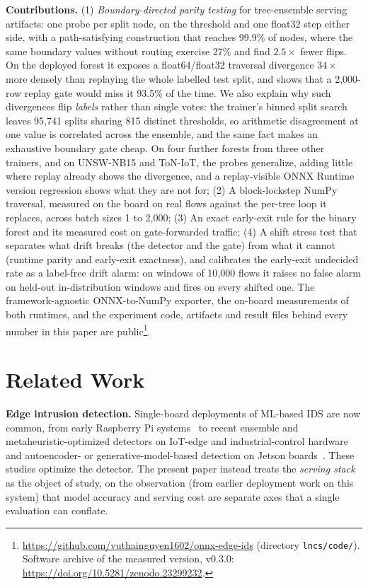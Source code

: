 \documentclass[runningheads]{llncs}
\begin{document}
\textbf{Contributions.}
(1) \emph{Boundary-directed parity testing} for tree-ensemble serving artifacts: one probe per split node, on the threshold and one float32 step either side, with a path-satisfying construction that reaches 99.9\% of nodes, where the same boundary values without routing exercise 27\% and find $2.5\times$ fewer flips. On the deployed forest it exposes a float64/float32 traversal divergence $34\times$ more densely than replaying the whole labelled test split, and shows that a 2{,}000-row replay gate would miss it 93.5\% of the time. We also explain why such divergences flip \emph{labels} rather than single votes: the trainer's binned split search leaves 95{,}741 splits sharing 815 distinct thresholds, so arithmetic disagreement at one value is correlated across the ensemble, and the same fact makes an exhaustive boundary gate cheap. On four further forests from three other trainers, and on UNSW-NB15 and ToN-IoT, the probes generalize, adding little where replay already shows the divergence, and a replay-visible ONNX Runtime version regression shows what they are not for;
(2) A block-lockstep NumPy traversal, measured on the board on real flows against the per-tree loop it replaces, across batch sizes 1 to 2{,}000;
(3) An exact early-exit rule for the binary forest and its measured cost on gate-forwarded traffic;
(4) A shift stress test that separates what drift breaks (the detector and the gate) from what it cannot (runtime parity and early-exit exactness), and calibrates the early-exit undecided rate as a label-free drift alarm: on windows of 10{,}000 flows it raises no false alarm on held-out in-distribution windows and fires on every shifted one.
The framework-agnostic ONNX-to-NumPy exporter, the on-board measurements of both runtimes, and the experiment code, artifacts and result files behind every number in this paper are public\footnote{\url{https://github.com/vuthainguyen1602/onnx-edge-ids} (directory \texttt{lncs/code/}). Software archive of the measured version, v0.3.0: \url{https://doi.org/10.5281/zenodo.23299232}.}.

\section{Related Work}

\textbf{Edge intrusion detection.} Single-board deployments of ML-based IDS are now common, from early Raspberry Pi systems~\cite{sforzin2016rpids} to recent ensemble and metaheuristic-optimized detectors on IoT-edge and industrial-control hardware~\cite{baalaji2025ensemble,asghar2026hedid,zhang2026edgeics} and autoencoder- or generative-model-based detection on Jetson boards~\cite{hasan2025iiot,diazgorrin2026jetson}. These studies optimize the detector. The present paper instead treats the \emph{serving stack} as the object of study, on the observation (from earlier deployment work on this system) that model accuracy and serving cost are separate axes that a single evaluation can conflate.
\end{document}

